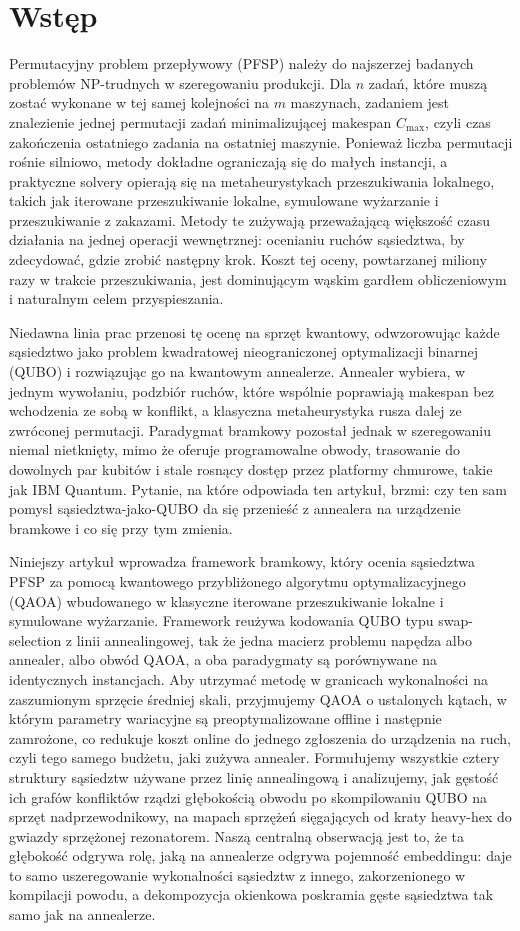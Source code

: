 \documentclass[11pt,a4paper]{article}
\begin{document}
\section{Wstęp}
\label{sec:intro}
Permutacyjny problem przepływowy (PFSP) należy do najszerzej badanych
problemów NP-trudnych w szeregowaniu produkcji. Dla $n$ zadań, które muszą
zostać wykonane w tej samej kolejności na $m$ maszynach, zadaniem jest
znalezienie jednej permutacji zadań minimalizującej makespan $C_{\max}$, czyli
czas zakończenia ostatniego zadania na ostatniej maszynie. Ponieważ liczba
permutacji rośnie silniowo, metody dokładne ograniczają się do małych
instancji, a praktyczne solvery opierają się na metaheurystykach
przeszukiwania lokalnego, takich jak iterowane przeszukiwanie lokalne,
symulowane wyżarzanie i przeszukiwanie z zakazami. Metody te zużywają
przeważającą większość czasu działania na jednej operacji wewnętrznej:
ocenianiu ruchów sąsiedztwa, by zdecydować, gdzie zrobić następny krok. Koszt
tej oceny, powtarzanej miliony razy w trakcie przeszukiwania, jest dominującym
wąskim gardłem obliczeniowym i naturalnym celem przyspieszania.

Niedawna linia prac przenosi tę ocenę na sprzęt kwantowy, odwzorowując każde
sąsiedztwo jako problem kwadratowej nieograniczonej optymalizacji binarnej
(QUBO) i rozwiązując go na kwantowym annealerze. Annealer wybiera, w jednym
wywołaniu, podzbiór ruchów, które wspólnie poprawiają makespan bez wchodzenia
ze sobą w konflikt, a klasyczna metaheurystyka rusza dalej ze zwróconej
permutacji. Paradygmat bramkowy pozostał jednak w szeregowaniu niemal
nietknięty, mimo że oferuje programowalne obwody, trasowanie do dowolnych par
kubitów i stale rosnący dostęp przez platformy chmurowe, takie jak IBM
Quantum. Pytanie, na które odpowiada ten artykuł, brzmi: czy ten sam pomysł
sąsiedztwa-jako-QUBO da się przenieść z annealera na urządzenie bramkowe i co
się przy tym zmienia.

Niniejszy artykuł wprowadza framework bramkowy, który ocenia sąsiedztwa PFSP
za pomocą kwantowego przybliżonego algorytmu optymalizacyjnego (QAOA)
wbudowanego w klasyczne iterowane przeszukiwanie lokalne i symulowane
wyżarzanie. Framework reużywa kodowania QUBO typu swap-selection z linii
annealingowej, tak że jedna macierz problemu napędza albo annealer, albo obwód
QAOA, a oba paradygmaty są porównywane na identycznych instancjach. Aby
utrzymać metodę w granicach wykonalności na zaszumionym sprzęcie średniej
skali, przyjmujemy QAOA o ustalonych kątach, w którym parametry wariacyjne są
preoptymalizowane offline i następnie zamrożone, co redukuje koszt online do
jednego zgłoszenia do urządzenia na ruch, czyli tego samego budżetu, jaki
zużywa annealer.
Formułujemy wszystkie cztery struktury sąsiedztw używane przez linię
annealingową i analizujemy, jak gęstość ich grafów konfliktów rządzi
głębokością obwodu po skompilowaniu QUBO na sprzęt nadprzewodnikowy, na mapach
sprzężeń sięgających od kraty heavy-hex do gwiazdy sprzężonej rezonatorem.
Naszą centralną obserwacją jest to, że ta głębokość odgrywa rolę, jaką na
annealerze odgrywa pojemność embeddingu: daje to samo uszeregowanie
wykonalności sąsiedztw z innego, zakorzenionego w kompilacji powodu,
a dekompozycja okienkowa poskramia gęste sąsiedztwa tak samo jak na
annealerze.
\end{document}
